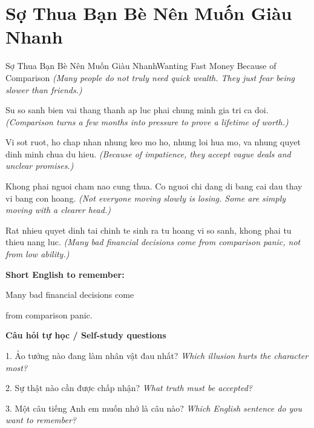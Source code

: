 \section{Sợ Thua Bạn Bè Nên Muốn Giàu Nhanh}
\begin{truyen}{Sợ Thua Bạn Bè Nên Muốn Giàu Nhanh}{Wanting Fast Money Because of Comparison}
\textit{(Many people do not truly need quick wealth. They just fear being slower than friends.)}

Su so sanh bien vai thang thanh ap luc phai chung minh gia tri ca doi.
\textit{(Comparison turns a few months into pressure to prove a lifetime of worth.)}

Vi sot ruot, ho chap nhan nhung keo mo ho, nhung loi hua mo, va nhung quyet dinh minh chua du hieu.
\textit{(Because of impatience, they accept vague deals and unclear promises.)}

Khong phai nguoi cham nao cung thua. Co nguoi chi dang di bang cai dau thay vi bang con hoang.
\textit{(Not everyone moving slowly is losing. Some are simply moving with a clearer head.)}

\end{truyen}

\begin{baihoc}
Rat nhieu quyet dinh tai chinh te sinh ra tu hoang vi so sanh, khong phai tu thieu nang luc.
\textit{(Many bad financial decisions come from comparison panic, not from low ability.)}
\end{baihoc}

\begin{ghinhoanh}
\textbf{Short English to remember:}

Many bad financial decisions come

from comparison panic.

\end{ghinhoanh}

\begin{tuhocnhanh}
\textbf{Câu hỏi tự học / Self-study questions}

1. Ảo tưởng nào đang làm nhân vật đau nhất? \textit{Which illusion hurts the character most?}

2. Sự thật nào cần được chấp nhận? \textit{What truth must be accepted?}

3. Một câu tiếng Anh em muốn nhớ là câu nào? \textit{Which English sentence do you want to remember?}
\end{tuhocnhanh}
\ngancach

